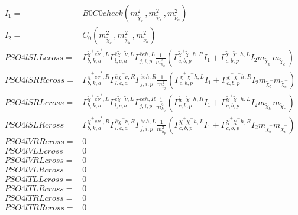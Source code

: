 \documentclass[A4,landscape]{article}
\begin{document}
\begin{align} 
I_1= & B0C0check(m^2_{\tilde{\chi}^-_{{c}}}, m^2_{\tilde{\chi}^-_{{b}}}, m^2_{\tilde{\nu}_{{a}}}) \\ 
I_2= & C_0(m^2_{\tilde{\chi}^-_{{c}}}, m^2_{\tilde{\chi}^-_{{b}}}, m^2_{\tilde{\nu}_{{a}}}) \\ 
  PSO4lSLLcross= &  \Gamma^{\tilde{\chi}^+e \tilde{\nu}^*,L}_{b, k, a} \Gamma^{\bar{e}\tilde{\chi}^- \tilde{\nu} ,L}_{l, c, a} \Gamma^{\bar{e}e h ,L}_{j, i, p} \frac{1}{m^2_{h_{{p}}}} (\Gamma^{\tilde{\chi}^+\tilde{\chi}^- h ,R}_{c, b, p} I_1 + \Gamma^{\tilde{\chi}^+\tilde{\chi}^- h ,L}_{c, b, p} I_2 m_{\tilde{\chi}^-_{{b}}} m_{\tilde{\chi}^-_{{c}}}) \\ 
  PSO4lSRRcross= &  \Gamma^{\tilde{\chi}^+e \tilde{\nu}^*,R}_{b, k, a} \Gamma^{\bar{e}\tilde{\chi}^- \tilde{\nu} ,R}_{l, c, a} \Gamma^{\bar{e}e h ,R}_{j, i, p} \frac{1}{m^2_{h_{{p}}}} (\Gamma^{\tilde{\chi}^+\tilde{\chi}^- h ,L}_{c, b, p} I_1 + \Gamma^{\tilde{\chi}^+\tilde{\chi}^- h ,R}_{c, b, p} I_2 m_{\tilde{\chi}^-_{{b}}} m_{\tilde{\chi}^-_{{c}}}) \\ 
  PSO4lSRLcross= &  \Gamma^{\tilde{\chi}^+e \tilde{\nu}^*,L}_{b, k, a} \Gamma^{\bar{e}\tilde{\chi}^- \tilde{\nu} ,L}_{l, c, a} \Gamma^{\bar{e}e h ,R}_{j, i, p} \frac{1}{m^2_{h_{{p}}}} (\Gamma^{\tilde{\chi}^+\tilde{\chi}^- h ,R}_{c, b, p} I_1 + \Gamma^{\tilde{\chi}^+\tilde{\chi}^- h ,L}_{c, b, p} I_2 m_{\tilde{\chi}^-_{{b}}} m_{\tilde{\chi}^-_{{c}}}) \\ 
  PSO4lSLRcross= &  \Gamma^{\tilde{\chi}^+e \tilde{\nu}^*,R}_{b, k, a} \Gamma^{\bar{e}\tilde{\chi}^- \tilde{\nu} ,R}_{l, c, a} \Gamma^{\bar{e}e h ,L}_{j, i, p} \frac{1}{m^2_{h_{{p}}}} (\Gamma^{\tilde{\chi}^+\tilde{\chi}^- h ,L}_{c, b, p} I_1 + \Gamma^{\tilde{\chi}^+\tilde{\chi}^- h ,R}_{c, b, p} I_2 m_{\tilde{\chi}^-_{{b}}} m_{\tilde{\chi}^-_{{c}}}) \\ 
  PSO4lVRRcross= & 0 \\ 
  PSO4lVLLcross= & 0 \\ 
  PSO4lVRLcross= & 0 \\ 
  PSO4lVLRcross= & 0 \\ 
  PSO4lTLLcross= & 0 \\ 
  PSO4lTLRcross= & 0 \\ 
  PSO4lTRLcross= & 0 \\ 
  PSO4lTRRcross= & 0 \\ 
\end{align} 
\end{document}
